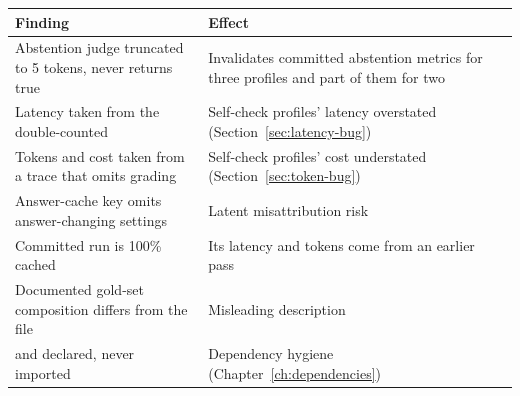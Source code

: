 \begin{center}
\begin{tabularx}{\textwidth}{@{}>{\raggedright\arraybackslash}p{6.6cm}L@{}}
\toprule
\textbf{Finding} & \textbf{Effect}\\
\midrule
Abstention judge truncated to 5 tokens, never returns true & Invalidates committed abstention metrics for three profiles and part of them for two\\
Latency taken from the double-counted  & Self-check profiles' latency overstated (Section~\ref{sec:latency-bug})\\
Tokens and cost taken from a trace that omits grading & Self-check profiles' cost understated (Section~\ref{sec:token-bug})\\
Answer-cache key omits answer-changing settings & Latent misattribution risk\\
Committed  run is 100\% cached & Its latency and tokens come from an earlier pass\\
Documented gold-set composition differs from the file & Misleading description\\
 and  declared, never imported & Dependency hygiene (Chapter~\ref{ch:dependencies})\\
\bottomrule
\end{tabularx}
\end{center}
